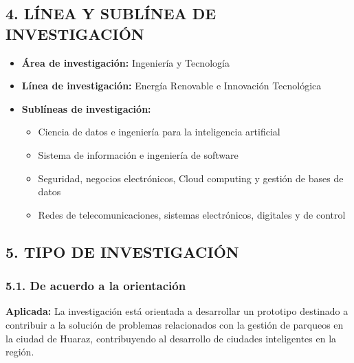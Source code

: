 \documentclass[12pt,a4paper]{article}
\begin{document}

\subsection*{4. LÍNEA Y SUBLÍNEA DE INVESTIGACIÓN}
\begin{itemize}[leftmargin=*]
	\item \textbf{Área de investigación:} Ingeniería y Tecnología
	\item \textbf{Línea de investigación:} Energía Renovable e Innovación Tecnológica
	\item \textbf{Sublíneas de investigación:} 
	\begin{itemize}
		\item Ciencia de datos e ingeniería para la inteligencia artificial
		\item Sistema de información e ingeniería de software
		\item Seguridad, negocios electrónicos, Cloud computing y gestión de bases de datos
		\item Redes de telecomunicaciones, sistemas electrónicos, digitales y de control
	\end{itemize}
\end{itemize}

\subsection*{5. TIPO DE INVESTIGACIÓN}

\subsubsection*{5.1. De acuerdo a la orientación}
\textbf{Aplicada:} La investigación está orientada a desarrollar un prototipo destinado a contribuir a la solución de problemas relacionados con la gestión de parqueos en la ciudad de Huaraz, contribuyendo al desarrollo de ciudades inteligentes en la región.
\end{document}
